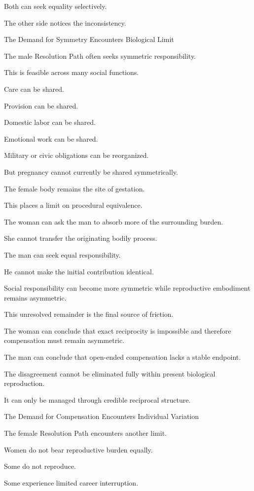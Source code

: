 Both can seek equality selectively.

The other side notices the inconsistency.

The Demand for Symmetry Encounters Biological Limit

The male Resolution Path often seeks symmetric responsibility.

This is feasible across many social functions.

Care can be shared.

Provision can be shared.

Domestic labor can be shared.

Emotional work can be shared.

Military or civic obligations can be reorganized.

But pregnancy cannot currently be shared symmetrically.

The female body remains the site of gestation.

This places a limit on procedural equivalence.

The woman can ask the man to absorb more of the surrounding burden.

She cannot transfer the originating bodily process.

The man can seek equal responsibility.

He cannot make the initial contribution identical.

Social responsibility can become more symmetric while reproductive embodiment remains asymmetric.

This unresolved remainder is the final source of friction.

The woman can conclude that exact reciprocity is impossible and therefore compensation must remain asymmetric.

The man can conclude that open-ended compensation lacks a stable endpoint.

The disagreement cannot be eliminated fully within present biological reproduction.

It can only be managed through credible reciprocal structure.

The Demand for Compensation Encounters Individual Variation

The female Resolution Path encounters another limit.

Women do not bear reproductive burden equally.

Some do not reproduce.

Some experience limited career interruption.

